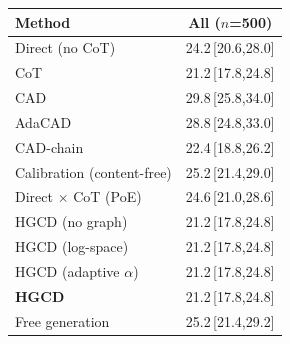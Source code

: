 \begin{tabular}{lc}
\toprule
Method & All ($n$=500) \\
\midrule
Direct (no CoT) & 24.2\,{\scriptsize[20.6,28.0]} \\
CoT & 21.2\,{\scriptsize[17.8,24.8]} \\
CAD & 29.8\,{\scriptsize[25.8,34.0]} \\
AdaCAD & 28.8\,{\scriptsize[24.8,33.0]} \\
CAD-chain & 22.4\,{\scriptsize[18.8,26.2]} \\
Calibration (content-free) & 25.2\,{\scriptsize[21.4,29.0]} \\
Direct $\times$ CoT (PoE) & 24.6\,{\scriptsize[21.0,28.6]} \\
HGCD (no graph) & 21.2\,{\scriptsize[17.8,24.8]} \\
HGCD (log-space) & 21.2\,{\scriptsize[17.8,24.8]} \\
HGCD (adaptive $\alpha$) & 21.2\,{\scriptsize[17.8,24.8]} \\
\textbf{HGCD} & 21.2\,{\scriptsize[17.8,24.8]} \\
Free generation & 25.2\,{\scriptsize[21.4,29.2]} \\
\bottomrule
\end{tabular}
